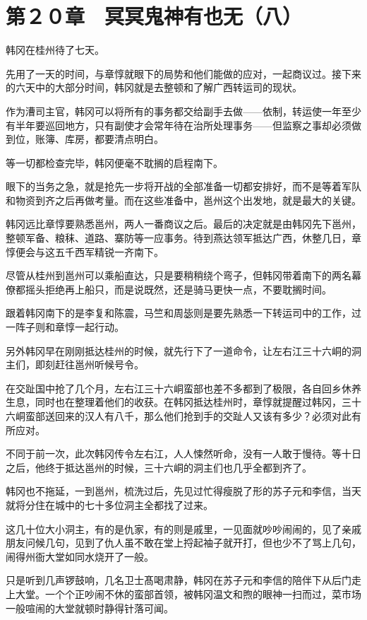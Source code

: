 \section{第２０章　冥冥鬼神有也无（八）}

韩冈在桂州待了七天。

先用了一天的时间，与章惇就眼下的局势和他们能做的应对，一起商议过。接下来的六天中的大部分时间，韩冈就是去整顿和了解广西转运司的现状。

作为漕司主官，韩冈可以将所有的事务都交给副手去做——依制，转运使一年至少有半年要巡回地方，只有副使才会常年待在治所处理事务——但监察之事却必须做到位，账簿、库房，都要清点明白。

等一切都检查完毕，韩冈便毫不耽搁的启程南下。

眼下的当务之急，就是抢先一步将开战的全部准备一切都安排好，而不是等着军队和物资到齐之后再做考量。而在这些准备中，邕州这个出发地，就是最大的关键。

韩冈远比章惇要熟悉邕州，两人一番商议之后。最后的决定就是由韩冈先下邕州，整顿军备、粮秣、道路、寨防等一应事务。待到燕达领军抵达广西，休整几日，章惇便会与这五千西军精锐一齐南下。

尽管从桂州到邕州可以乘船直达，只是要稍稍绕个弯子，但韩冈带着南下的两名幕僚都摇头拒绝再上船只，而是说既然，还是骑马更快一点，不要耽搁时间。

跟着韩冈南下的是李复和陈震，马竺和周毖则是要先熟悉一下转运司中的工作，过一阵子则和章惇一起行动。

另外韩冈早在刚刚抵达桂州的时候，就先行下了一道命令，让左右江三十六峒的洞主们，即刻赶往邕州听候号令。

在交趾国中抢了几个月，左右江三十六峒蛮部也差不多都到了极限，各自回乡休养生息，同时也在整理着他们的收获。在韩冈抵达桂州时，章惇就提醒过韩冈，三十六峒蛮部送回来的汉人有八千，那么他们抢到手的交趾人又该有多少？必须对此有所应对。

不同于前一次，此次韩冈传令左右江，人人悚然听命，没有一人敢于慢待。等十日之后，他终于抵达邕州的时候，三十六峒的洞主们也几乎全都到齐了。

韩冈也不拖延，一到邕州，梳洗过后，先见过忙得瘦脱了形的苏子元和李信，当天就将分住在城中的七十多位洞主全都找了过来。

这几十位大小洞主，有的是仇家，有的则是戚里，一见面就吵吵闹闹的，见了亲戚朋友问候几句，见到了仇人虽不敢在堂上捋起袖子就开打，但也少不了骂上几句，闹得州衙大堂如同水烧开了一般。

只是听到几声锣鼓响，几名卫士髙喝肃静，韩冈在苏子元和李信的陪伴下从后门走上大堂。一个个正吵闹不休的蛮部首领，被韩冈温文和煦的眼神一扫而过，菜市场一般喧闹的大堂就顿时静得针落可闻。

